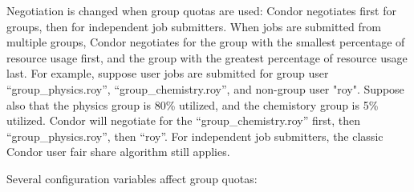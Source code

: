 Negotiation is changed when group quotas are used: Condor negotiates
first for groups, then for independent job submitters.  When jobs are
submitted from multiple groups, Condor negotiates for the group with
the smallest percentage of resource usage first, and the group with
the greatest percentage of resource usage last.  For example, suppose
user jobs are submitted for group user ``group\_physics.roy'',
``group\_chemistry.roy'', and non-group user "roy".  Suppose also that
the physics group is 80\% utilized, and the chemistory group is 5\%
utilized.  Condor will negotiate for the ``group\_chemistry.roy''
first, then ``group\_physics.roy'', then ``roy''.  For independent job
submitters, the classic Condor user fair share algorithm still
applies.

Several configuration variables affect group quotas:

